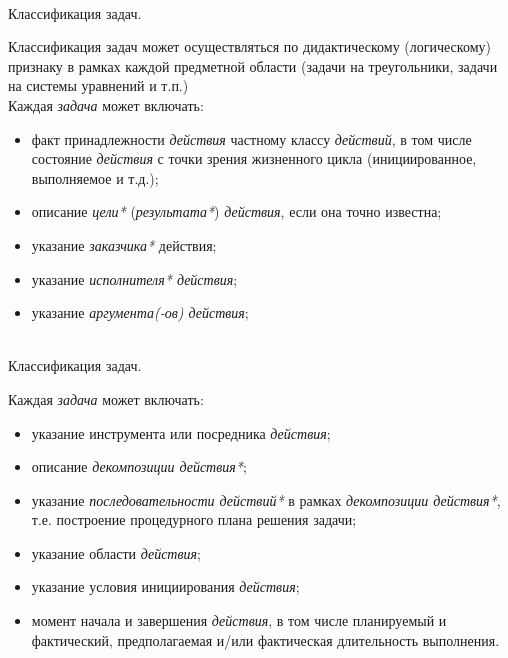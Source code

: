 \begin{frame}{\\Классификация задач.}
	\topline
	\justifying
 
    Классификация задач может осуществляться по дидактическому (логическому) признаку в рамках каждой предметной области (задачи на треугольники, задачи на системы уравнений и т.п.)\\
    Каждая \textit{задача} может включать:
    \begin{itemize}
        \item факт принадлежности \textit{действия} частному классу \textit{действий}, в том числе состояние \textit{действия} с точки зрения жизненного цикла (инициированное, выполняемое и т.д.);
        \item описание \textit{цели*} (\textit{результата*}) \textit{действия}, если она точно известна;
        \item указание \textit{заказчика*} действия;
        \item указание \textit{исполнителя* действия};
        \item указание \textit{аргумента(-ов) действия\scnrolesign};
    \end{itemize}
\end{frame}

\begin{frame}{\\Классификация задач.}
	\topline
	\justifying
 
    Каждая \textit{задача} может включать:
    \begin{itemize}
        \item указание инструмента или посредника \textit{действия};
        \item описание \textit{декомпозиции действия*};
        \item указание \textit{последовательности действий*} в рамках \textit{декомпозиции действия*}, т.е. построение процедурного плана решения задачи;
        \item указание области \textit{действия};
        \item указание условия инициирования \textit{действия};
        \item момент начала и завершения \textit{действия}, в том числе планируемый и фактический, предполагаемая и/или фактическая длительность выполнения.
    \end{itemize}
\end{frame}

